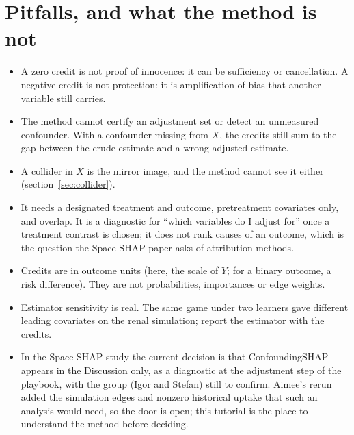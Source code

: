 \documentclass[10pt,letterpaper]{article}
\begin{document}
\section{Pitfalls, and what the method is not}
\begin{itemize}\setlength{\itemsep}{1pt}
\item A zero credit is not proof of innocence: it can be sufficiency or cancellation. A negative credit is not protection: it is amplification of bias that another variable still carries.
\item The method cannot certify an adjustment set or detect an unmeasured confounder. With a confounder missing from $X$, the credits still sum to the gap between the crude estimate and a wrong adjusted estimate.
\item A collider in $X$ is the mirror image, and the method cannot see it either (section~\ref{sec:collider}).
\item It needs a designated treatment and outcome, pretreatment covariates only, and overlap. It is a diagnostic for ``which variables do I adjust for'' once a treatment contrast is chosen; it does not rank causes of an outcome, which is the question the Space SHAP paper asks of attribution methods.
\item Credits are in outcome units (here, the scale of $Y$; for a binary outcome, a risk difference). They are not probabilities, importances or edge weights.
\item Estimator sensitivity is real. The same game under two learners gave different leading covariates on the renal simulation; report the estimator with the credits.
\item In the Space SHAP study the current decision is that ConfoundingSHAP appears in the Discussion only, as a diagnostic at the adjustment step of the playbook, with the group (Igor and Stefan) still to confirm. Aimee's rerun added the simulation edges and nonzero historical uptake that such an analysis would need, so the door is open; this tutorial is the place to understand the method before deciding.
\end{itemize}
\end{document}
